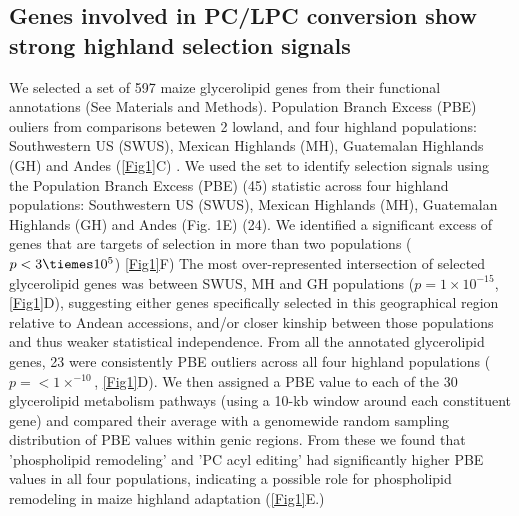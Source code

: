 \documentclass[9pt,twocolumn,twoside,lineno]{biorxiv}
\begin{document}
\subsection{Genes involved in PC/LPC conversion show strong highland selection signals} 
We selected a set of 597 maize glycerolipid genes from their functional annotations (See Materials and Methods).  Population Branch Excess (PBE) ouliers from comparisons betewen 2 lowland,  and four highland populations: Southwestern US (SWUS), Mexican Highlands (MH), Guatemalan Highlands (GH) and Andes (\cref{Fig1}C) \cite{Wang2020-mp}. We used the set to identify selection signals using the Population Branch Excess (PBE) (45) statistic across four highland populations: Southwestern US (SWUS), Mexican Highlands (MH), Guatemalan Highlands (GH) and Andes (Fig. 1E) (24). We identified a significant excess of genes that are targets of selection in more than two populations ($ p< 3 \tiemes 10^5$) \ref{Fig1}F)
The most over-represented intersection of selected glycerolipid genes was between SWUS, MH and GH populations ($p = 1  \times 10 ^{-15} $, \cref{Fig1}D), suggesting either genes specifically selected in this geographical region relative to Andean accessions, and/or closer kinship between those populations and thus weaker statistical independence.
From all the annotated glycerolipid genes, 23 were consistently PBE outliers across all four highland populations ($p =<1  \times  ^{-10}$, \cref{Fig1}D). 
We then assigned a PBE value to each of the 30 glycerolipid metabolism pathways (using a 10-kb window around each constituent gene)  and compared their average with a genomewide random sampling distribution of PBE values within genic regions. 
From these we found that 'phospholipid remodeling' and 'PC acyl editing' had significantly higher PBE values in all four populations, indicating a possible role for phospholipid remodeling in maize highland adaptation (\cref{Fig1}E.) 
\end{document}
